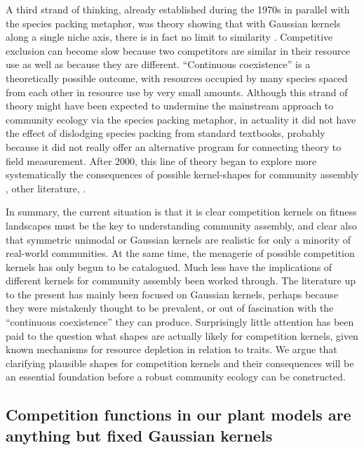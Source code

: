 \documentclass[a4paper,11pt]{article}
\begin{document}
A third strand of thinking, already established during the 1970s in parallel with the species packing metaphor, was theory showing that with Gaussian kernels along a single niche axis, there is in fact no limit to similarity \citep{May-1972, Abrams-1975, Abrams-1983}. Competitive exclusion can become slow because two competitors are similar in their resource use as well as because they are different. ``Continuous coexistence'' is a theoretically possible outcome, with resources occupied by many species spaced from each other in resource use by very small amounts. Although this strand of theory might have been expected to undermine the mainstream approach to community ecology via the species packing metaphor, in actuality it did not have the effect of dislodging species packing from standard textbooks, probably because it did not really offer an alternative program for connecting theory to field measurement.  After 2000, this line of theory began to explore more systematically the consequences of possible kernel-shapes for community assembly \citep{Scheffer-2006}, other literature, \citep{Leimar-2013}.

In summary, the current situation is that it is clear competition kernels on fitness landscapes must be the key to understanding community assembly, and clear also that symmetric unimodal or Gaussian kernels are realistic for only a minority of real-world communities. At the same time, the menagerie of possible competition kernels has only begun to be catalogued. Much less have the implications of different kernels for community assembly been worked through. The literature up to the present has mainly been focused on Gaussian kernels, perhaps because they were mistakenly thought to be prevalent, or out of fascination with the ``continuous coexistence'' they can produce. Surprisingly little attention has been paid to the question what shapes are actually likely for competition kernels, given known mechanisms for resource depletion in relation to traits. We argue that clarifying plausible shapes for competition kernels and their consequences will be an essential foundation before a robust community ecology can be constructed.

\subsection{Competition functions in our plant models are anything but fixed 
Gaussian kernels}
\end{document}

